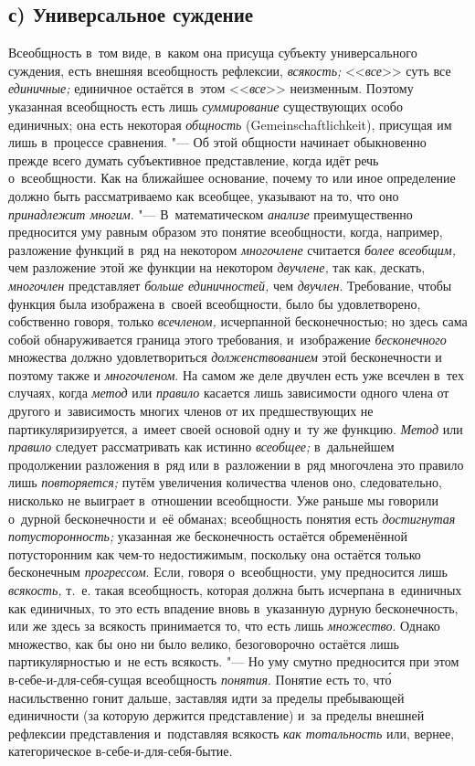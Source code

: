 \subsection[с) Универсальное суждение]{с) Универсальное суждение}

Всеобщность в~том виде, в~каком она присуща субъекту
универсального суждения, есть внешняя всеобщность рефлексии,
{\em всякость;} <<{\em все}>> суть все {\em единичные;}
единичное остаётся в~этом <<{\em все}>> неизменным.
Поэтому указанная всеобщность есть лишь {\em суммирование}
существующих особо единичных; она есть некоторая
{\em общность} (Gemein\-schaft\-lich\-keit),
присущая им лишь в~процессе сравнения. "--- Об
этой общности начинает обыкновенно прежде всего думать субъективное
представление, когда идёт речь о~всеобщности. Как на
ближайшее основание, почему то или иное определение должно быть
рассматриваемо как всеобщее, указывают на то, что оно
{\em принадлежит многим}. "--- В~математическом {\em анализе}
преимущественно предносится уму равным образом это понятие
всеобщности, когда, например, разложение функций в~ряд на некотором
{\em многочлене} считается {\em более всеобщим,} чем разложение этой же функции
на некотором {\em двучлене,} так как, дескать, {\em многочлен} представляет
{\em больше единичностей,} чем {\em двучлен}. Требование, чтобы функция была
изображена в~своей всеобщности, было бы удовлетворено, собственно говоря,
только {\em всечленом,} исчерпанной бесконечностью; но здесь сама собой
обнаруживается граница этого требования, и~изображение {\em бесконечного}
множества должно удовлетвориться {\em долженствованием} этой бесконечности и
поэтому также и {\em многочленом}. На самом же деле двучлен есть уже всечлен
в~тех случаях, когда {\em метод} или {\em правило} касается лишь зависимости
одного члена от другого и~зависимость многих членов от их предшествующих не
партикуляризируется, а~имеет своей основой одну и~ту же функцию. {\em Метод}
или {\em правило} следует рассматривать как истинно {\em всеобщее;}
в~дальнейшем продолжении разложения в~ряд или в~разложении в~ряд многочлена
это правило лишь {\em повторяется;} путём увеличения количества членов оно,
следовательно, нисколько не выиграет в~отношении всеобщности. Уже раньше мы
говорили о~дурной бесконечности и~её обманах; всеобщность понятия есть
{\em достигнутая потусторонность;} указанная же бесконечность остаётся
обременённой потусторонним как чем-то недостижимым, поскольку она остаётся
только бесконечным {\em прогрессом}. Если, говоря о~всеобщности, уму
предносится лишь {\em всякость,} т.~е. такая всеобщность, которая должна быть
исчерпана в~единичных как единичных, то это есть впадение вновь в~указанную
дурную бесконечность, или же здесь за всякость принимается то, что есть лишь
{\em множество}. Однако множество, как бы оно ни было велико, безоговорочно
остаётся лишь партикулярностью и~не есть всякость. "--- Но уму смутно
предносится при этом в-себе-и-для-себя-сущая всеобщность {\em понятия}. Понятие
есть то, чт\'{о} насильственно гонит дальше, заставляя идти за пределы пребывающей
единичности (за которую держится представление) и~за пределы внешней рефлексии
представления и~подставляя всякость {\em как тотальность} или, вернее,
категорическое в-себе-и-для-себя-бытие.


